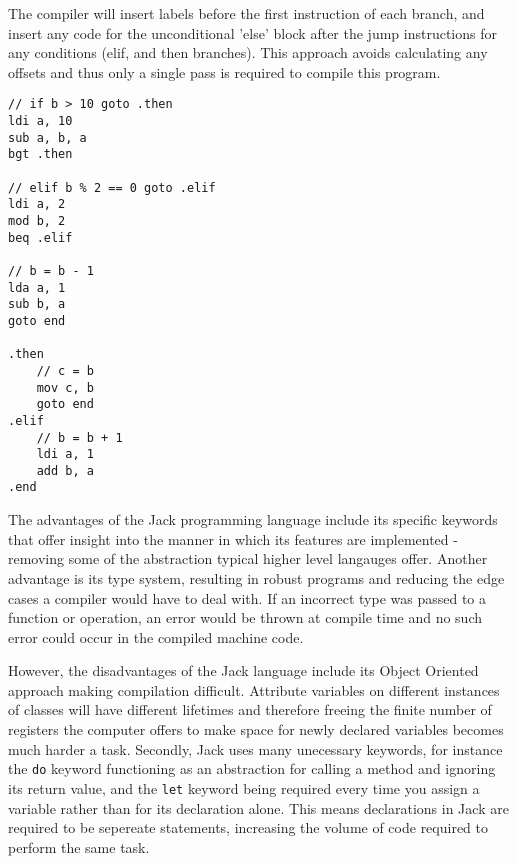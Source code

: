 The compiler will insert labels before the first instruction of each branch, and insert any code for the unconditional 'else' block after the jump instructions for any conditions (elif, and then branches). This approach avoids calculating any offsets and thus only a single pass is required to compile this program.

\begin{lstlisting}
// if b > 10 goto .then
ldi a, 10
sub a, b, a 
bgt .then

// elif b % 2 == 0 goto .elif
ldi a, 2
mod b, 2
beq .elif

// b = b - 1
lda a, 1
sub b, a
goto end

.then
    // c = b
    mov c, b
    goto end
.elif
    // b = b + 1
    ldi a, 1
    add b, a
.end
\end{lstlisting}

The advantages of the Jack programming language include its specific keywords that offer insight into the manner in which its features are implemented - removing some of the abstraction typical higher level langauges offer. Another advantage is its type system, resulting in robust programs and reducing the edge cases a compiler would have to deal with. If an incorrect type was passed to a function or operation, an error would be thrown at compile time and no such error could occur in the compiled machine code.

However, the disadvantages of the Jack language include its Object Oriented approach making compilation difficult. Attribute variables on different instances of classes will have different  lifetimes and therefore freeing the finite number of registers the computer offers to make space for newly declared variables becomes much harder a task. Secondly, Jack uses many unecessary keywords, for instance the \texttt{do} keyword functioning as an abstraction for calling a method and ignoring its return value, and the \texttt{let} keyword being required every time you assign a variable rather than for its declaration alone. This means declarations in Jack are required to be sepereate statements, increasing the volume of code required to perform the same task.

